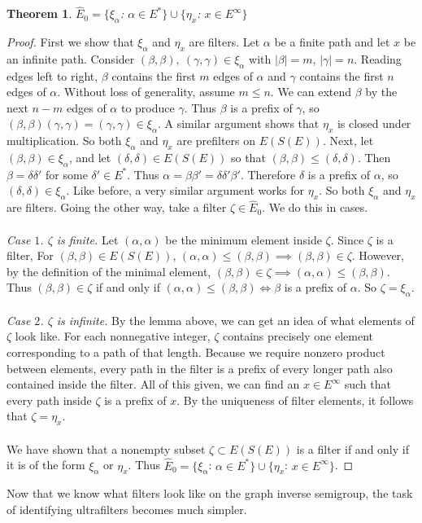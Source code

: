 \documentclass{article}
\newtheorem*{theorem}{Theorem}
\begin{document}
\begin{theorem} $\hat{E}_0 = \{\xi_\alpha$: $\alpha \in E^*\} \cup \{\eta_x$: $x \in E^\infty\}$ \end{theorem}
\begin{proof}
    First we show that $\xi_\alpha$ and $\eta_x$ are filters. Let $\alpha$ be a finite path and let $x$ be an infinite path.
    Consider $(\beta, \beta), \ (\gamma, \gamma) \in \xi_\alpha$ with $|\beta| = m$, $|\gamma| = n$. 
    Reading edges left to right, $\beta$ contains the first $m$ edges of $\alpha$ and $\gamma$ 
    contains the first $n$ edges of $\alpha$. Without loss of generality, assume $m \leq n$. 
    We can extend $\beta$ by the next $n - m$ edges of $\alpha$ to produce $\gamma$. Thus
    $\beta$ is a prefix of $\gamma$, so $(\beta, \beta)(\gamma, \gamma) = (\gamma, \gamma) \in \xi_\alpha$.
    A similar argument shows that $\eta_x$ is closed under multiplication. So both $\xi_\alpha$ and $\eta_x$ are prefilters
    on $E(S(E))$. Next, let $(\beta, \beta) \in \xi_\alpha$, and let $(\delta, \delta) \in E(S(E))$ so that 
    $(\beta, \beta) \leq (\delta, \delta)$. Then $\beta = \delta \delta'$ for some $\delta' \in E^*$. 
    Thus $\alpha = \beta \beta' = \delta \delta' \beta'$. Therefore $\delta$ is a prefix of $\alpha$, so 
    $(\delta, \delta) \in \xi_\alpha$. Like before, a very similar argument works for $\eta_x$. So both 
    $\xi_\alpha$ and $\eta_x$ are filters. Going the other way, take a filter $\zeta \in \hat{E}_0$.
    We do this in cases.
    \\ \\
    \textit{Case $1$. $\zeta$ is finite.}
    Let $(\alpha, \alpha)$ be the minimum element inside $\zeta$. Since $\zeta$ is a filter,
    For $(\beta, \beta) \in E(S(E))$, $(\alpha, \alpha) \leq (\beta, \beta) \implies (\beta, \beta) \in \zeta$.
    However, by the definition of the minimal element, $(\beta, \beta) \in \zeta \implies (\alpha, \alpha) \leq (\beta, \beta)$.
    Thus $(\beta, \beta) \in \zeta$ if and only if $(\alpha, \alpha) \leq (\beta, \beta) \iff \beta$ is a prefix of $\alpha$. So $\zeta = \xi_\alpha$.
    \\ \\
    \textit{Case $2$. $\zeta$ is infinite.}
    By the lemma above, we can get an idea of what elements of $\zeta$ look like.
    For each nonnegative integer, $\zeta$ contains precisely one element corresponding
    to a path of that length. Because we require nonzero product between elements, every
    path in the filter is a prefix of every longer path also contained inside the filter.
    All of this given, we can find an $x \in E^\infty$ such that every path inside $\zeta$
    is a prefix of $x$. By the uniqueness of filter elements, it follows that $\zeta = \eta_x$.
    \\ \\
    We have shown that a nonempty subset $\zeta \subset E(S(E))$ is a filter if and only if
    it is of the form $\xi_\alpha$ or $\eta_x$. Thus $\hat{E}_0 = \{\xi_\alpha$: $\alpha \in E^*\} \cup \{\eta_x$: $x \in E^\infty\}$.
\end{proof}
Now that we know what filters look like on the graph inverse semigroup, the task of identifying ultrafilters becomes much simpler.
\end{document}
